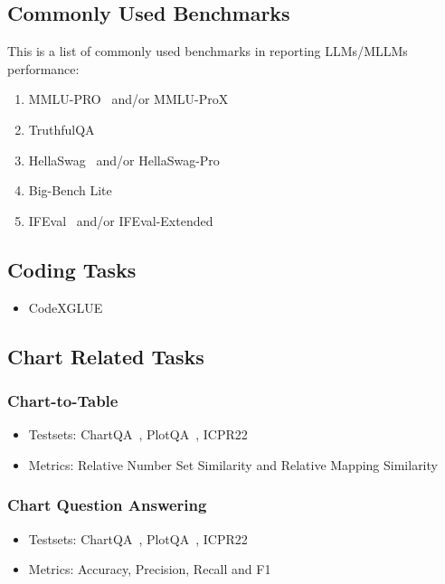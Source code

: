 \documentclass[
	letterpaper, %
]{jdf}
\begin{document}
\subsection{Commonly Used Benchmarks}\label{ssect:common}
This is a list of commonly used benchmarks in reporting LLMs/MLLMs performance:
\begin{enumerate}
    \item MMLU-PRO~\cite{wang2024mmlu} and/or MMLU-ProX~\cite{xuan2025mmlu}
    \item TruthfulQA\cite{lin2021truthfulqa}
    \item HellaSwag~\cite{zellers2019hellaswag} and/or HellaSwag-Pro~\cite{li2025hellaswag}
    \item Big-Bench Lite~\cite{srivastava2023beyond}
    \item IFEval~\cite{zhou2023instruction} and/or IFEval-Extended~\cite{kovalevskyi2024ifeval}
              \end{enumerate}
              \subsection{Coding Tasks}
              \begin{itemize}
    \item CodeXGLUE~\cite{lu2021codexglue}
                            \end{itemize}
                            \subsection{Chart Related Tasks}
\subsubsection{Chart-to-Table}
\begin{itemize}
    \item Testsets: ChartQA~\cite{masry2022chartqa}, PlotQA~\cite{methani2020plotqa}, ICPR22
         \item Metrics: Relative Number Set Similarity and Relative Mapping Similarity~\cite{liu2022deplot}
              \end{itemize}
\subsubsection{Chart Question Answering}
\begin{itemize}
    \item Testsets: ChartQA~\cite{masry2022chartqa}, PlotQA~\cite{methani2020plotqa}, ICPR22
         \item Metrics: Accuracy, Precision, Recall and F1
              \end{itemize}
\end{document}
